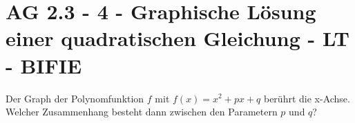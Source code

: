\section{AG 2.3 - 4 - Graphische Lösung einer quadratischen Gleichung  - LT - BIFIE}

\begin{beispiel}[AG 2.3]{1} %
			Der Graph der Polynomfunktion $f$ mit $f(x)=x^2+px+q$ berührt die x-Achse. Welcher Zusammenhang besteht dann zwischen den Parametern $p$ und $q$?
				
\end{beispiel}